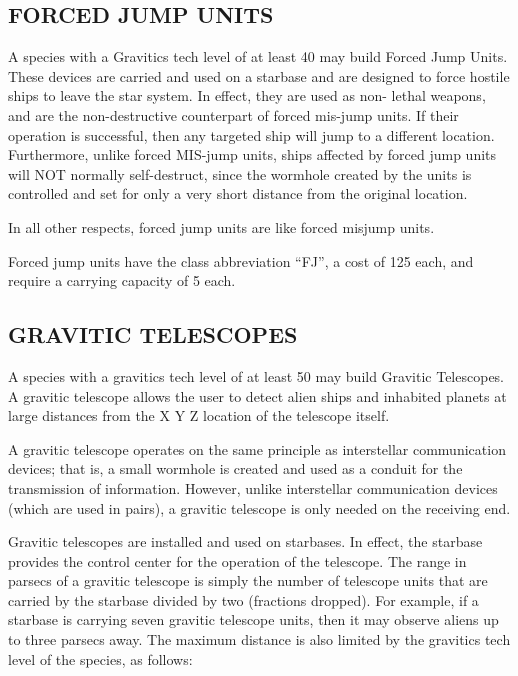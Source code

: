 \documentclass[10pt,titlepage]{article}
\begin{document}
\newpage
\subsection{FORCED JUMP UNITS}

A species with a Gravitics tech level of at least 40 may build Forced Jump
Units.  These devices are carried and used on a starbase and are designed to
force hostile ships to leave the star system.  In effect, they are used as non-
lethal weapons, and are the non-destructive counterpart of forced mis-jump
units.  If their operation is successful, then any targeted ship will jump to a
different location.  Furthermore, unlike forced MIS-jump units, ships affected
by forced jump units will NOT normally self-destruct, since the wormhole
created by the units is controlled and set for only a very short distance
from the original location.

In all other respects, forced jump units are like forced misjump units.

Forced jump units have the class abbreviation ``FJ'', a cost of 125 each, and
require a carrying capacity of 5 each.

\newpage
\subsection{GRAVITIC TELESCOPES}

A species with a gravitics tech level of at least 50 may build Gravitic
Telescopes.  A gravitic telescope allows the user to detect alien ships and
inhabited planets at large distances from the X Y Z location of the telescope
itself.

A gravitic telescope operates on the same principle as interstellar
communication devices; that is, a small wormhole is created and used as a
conduit for the transmission of information.  However, unlike interstellar
communication devices (which are used in pairs), a gravitic telescope is only
needed on the receiving end.

Gravitic telescopes are installed and used on starbases.  In effect, the
starbase provides the control center for the operation of the telescope.  The
range in parsecs of a gravitic telescope is simply the number of telescope
units that are carried by the starbase divided by two (fractions dropped).  For
example, if a starbase is carrying seven gravitic telescope units, then it may
observe aliens up to three parsecs away.  The maximum distance is also limited
by the gravitics tech level of the species, as follows: 
\end{document}
